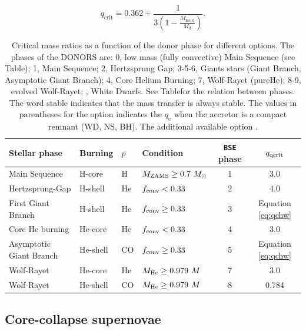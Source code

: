 \documentclass[a4paper,titlepage]{book}     	%
\newcommand{\sun}{\ensuremath{_\odot}}
\newcommand{\mzams}{M_\textup{ZAMS}}
\newcommand{\msun}{\ensuremath{M\sun}}
\begin{document}
\begin{equation}\label{eq:qch}
   q_\mathrm{crit} = 0.362 + \frac{1}{3\left(1-\frac{M_\mathrm{He,d}}{M_\mathrm{d}}\right)}.
\end{equation}


\begin{table}
    \centering
    \begin{tabular}{llllcc}
        \toprule
        Stellar phase & Burning & $p$ & Condition & \texttt{BSE} phase &  $q_{\rm qcrit}$ \\ 
        \midrule
        Main Sequence           & H-core    &  H   & $\mzams \geq 0.7~\msun$          &  1  & 3.0        \\
        Hertzsprung-Gap         & H-shell   &  He  & $f_{\rm conv} < 0.33$       &  2  & 4.0        \\
        First Giant Branch      & H-shell   &  He  & $f_{\rm conv} \geq 0.33$    &  3  & Equation \ref{eq:qchw} \\
        Core He burning         & He-core   &  He  & $f_{\rm conv} < 0.33$       &  4  & 3.0 \\ 
        Asymptotic Giant Branch & He-shell  &  CO  & $f_{\rm conv} \geq 0.33$    &  5  & Equation \ref{eq:qchw} \\
        \hline
        Wolf-Rayet              & He-core   &  He  & $M_{\rm He} \geq 0.979~M$  &  7  & 3.0 \\ 
        Wolf-Rayet              & He-shell  &  CO  & $M_{\rm He} \geq 0.979~M$  &  8  & 0.784 \\ 
        \bottomrule
        \end{tabular}
    \caption{Critical mass ratios  as a function of the donor phase for different options.
    The phases of the DONORS are: 0, low mass (fully convective) Main Sequence (see Table); 1, Main Sequence; 2, Hertzsprung Gap; 3-5-6, Giants stars (Giant Branch, Asymptotic Giant Branch); 4, Core Helium Burning; 7, Wolf-Rayet (pureHe); 8-9, evolved Wolf-Rayet; , White Dwarfs. See Tablefor the relation between  phases. The word stable indicates that the mass transfer is always stable. The values in parentheses for the option  indicates the $q_\mathrm{c}$ when the accretor is a compact remnant (WD, NS, BH). The additional  available option .}\label{tab:phasesqcritSEVN}
\end{table}




\subsection{Core-collapse supernovae}\label{subsec:SNmodels}
\end{document}

